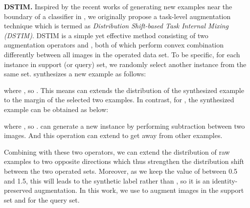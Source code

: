 \documentclass[letterpaper]{article} \usepackage{aaai21}  \usepackage{times}  \usepackage{helvet} \usepackage{courier}  \usepackage[hyphens]{url}  \usepackage{graphicx} \urlstyle{rm} \def\UrlFont{\rm}  \usepackage{natbib}  \usepackage{caption} \usepackage{url}
\begin{document}
\noindent\textbf{DSTIM.}
Inspired by the recent works of generating new examples near the boundary of a classifier in \cite{Zhang2018ICLRmixup,Qiao2019ICCV}, we originally propose a task-level augmentation technique which is termed as \emph{Distribution Shift-based Task Internal Mixing (DSTIM)}. DSTIM is a simple yet effective method consisting of two augmentation operators  and , both of which perform convex combination differently between all images in the operated data set. To be specific, for each instance  in support (or query) set, we randomly select another instance  from the same set.  synthesizes a new example  as follows:

where , so . This means  can extends the distribution of the synthesized example to the margin of the selected two examples. In contrast, for , the synthesized example  can be obtained as below:

where , so . 
 can generate a new instance by performing subtraction between two images. And this operation can extend to get away from other examples.


Combining with these two operators, we can extend the distribution of raw examples to two opposite directions which thus strengthen the distribution shift between the two operated sets. Moreover, as we keep the value of  between 0.5 and 1.5, this will leads to the synthetic label  rather than , so it is an identity-preserved augmentation. In this work, we use  to augment images in the support set and  for the query set. 

\iffalse
Inspired by the recent works of generating new examples near the boundary of a classifier in \cite{Zhang2018ICLRmixup,Qiao2019ICCV}, we originally propose a task-level augmentation technique which is termed as \emph{Distribution Shift-based Task Internal Mixing (DSTIM)}. DSTIM is a simple yet effective method consisting of two augmentation operators  and . These two operators perform convex combination differently between all images in the operated data set. To be specific, for each instance  in support (or query) set, we randomly select another instance  from the same set and synthesize a new example  as follows:

where for , , so , while for , , so . When ,  can generate a new instance by performing subtraction on two images. 
Note that, both  and  are input images rather than features. We process each instance a few times with Eq. (\ref{eqn:dstim}) to form a new task with more distribution shifts between the augmented support set and query set. In this work, we use  to augment images in the support set and  for the query set. Basically, DSTIM extends the distribution of raw task by incorporating the prior that if two examples are similar to each other in the original pixel space, then it is possible that they are closer in the feature space. The  operator extends the distribution to the margin of two examples whilst the  operator extends to get away from other examples. Besides, as we keep the value of  larger than 0.5, this will leads to the synthetic label  rather than , so it is an identity-preserved augmentation.
\fi
\end{document}
